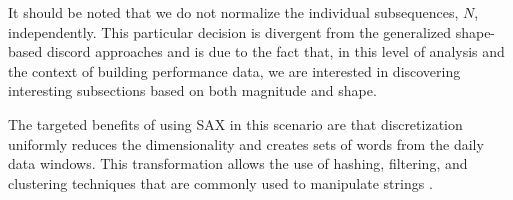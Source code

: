 It should be noted that we do not normalize the individual subsequences, $N$, independently. This particular decision is divergent from the generalized shape-based discord approaches and is due to the fact that, in this level of analysis and the context of building performance data,  we are interested in discovering interesting subsections based on both magnitude and shape. 

The targeted benefits of using SAX in this scenario are that discretization uniformly reduces the dimensionality and creates sets of words from the daily data windows. This transformation allows the use of hashing, filtering, and clustering techniques that are commonly used to manipulate strings \cite{lin_experiencing_2007}. 